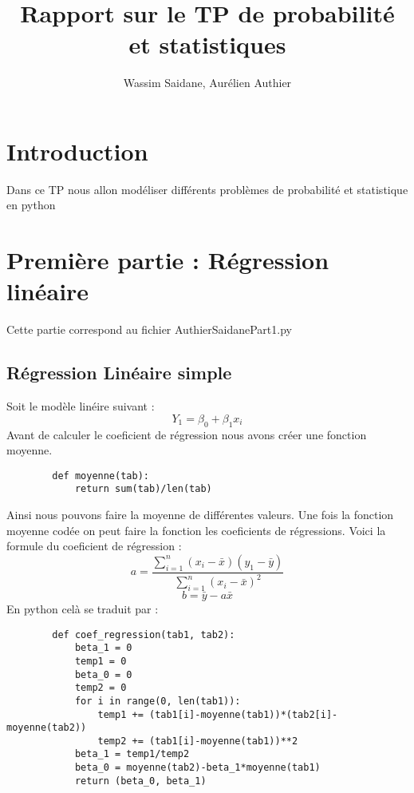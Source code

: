 \documentclass{article}
\title{Rapport sur le TP de probabilité et statistiques}
\author{Wassim Saidane, Aurélien Authier}
\date{}
\begin{document}
    \maketitle
    \tableofcontents
    \newpage
    \section*{Introduction}
    Dans ce TP nous allon modéliser différents problèmes de probabilité et statistique en python
    \section{Première partie : Régression linéaire}
    Cette partie correspond au fichier AuthierSaidanePart1.py
    \subsection{Régression Linéaire simple}
    Soit le modèle linéire suivant : 
    \begin{equation*}
        Y_1=\beta_0+\beta_1x_i
    \end{equation*}
    Avant de calculer le coeficient de régression nous avons créer une fonction moyenne.
    \begin{lstlisting}
        def moyenne(tab):
            return sum(tab)/len(tab)
    \end{lstlisting}
    Ainsi nous pouvons faire la moyenne de différentes valeurs. 
    Une fois la fonction moyenne codée on peut faire la fonction les coeficients de régressions.
    Voici la formule du coeficient de régression : 
    \begin{equation*}
        a=\frac{\sum^{n}_{i=1} (x_i-\bar{x})(y_1-\bar{y})}{\sum^{n}_{i=1} (x_i-\bar{x})^2}
    \end{equation*}
    \begin{equation*}
        b=\bar{y}-a\bar{x}
    \end{equation*}
    En python celà se traduit par : 
    \begin{lstlisting}
        def coef_regression(tab1, tab2):
            beta_1 = 0
            temp1 = 0
            beta_0 = 0
            temp2 = 0
            for i in range(0, len(tab1)):
                temp1 += (tab1[i]-moyenne(tab1))*(tab2[i]-moyenne(tab2))
                temp2 += (tab1[i]-moyenne(tab1))**2
            beta_1 = temp1/temp2
            beta_0 = moyenne(tab2)-beta_1*moyenne(tab1)
            return (beta_0, beta_1)
    \end{lstlisting}
\end{document}
